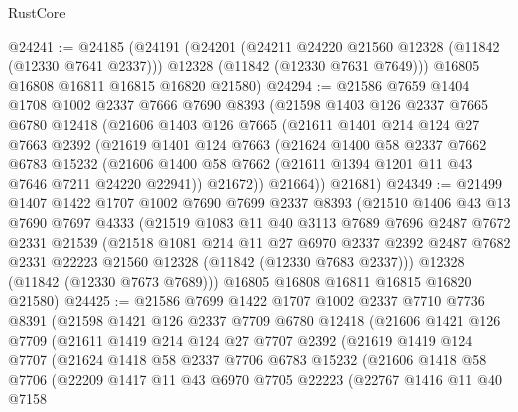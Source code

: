 \begin{lexlean}{RustCore}
\begin{coremodule}
@24241 := @24185
    (@24191
      (@24201
        (@24211 @24220 @21560 @12328 (@11842 (@12330 @7641 @2337)))
        @12328
        (@11842 (@12330 @7631 @7649)))
      @16805
      @16808
      @16811
      @16815
      @16820
      @21580)
@24294 := @21586
    @7659
    @1404
    @1708
    @1002
    @2337
    @7666
    @7690
    @8393
    (@21598
      @1403
      @126
      @2337
      @7665
      @6780
      @12418
      (@21606
        @1403
        @126
        @7665
        (@21611
          @1401
          @214
          @124
          @27
          @7663
          @2392
          (@21619
            @1401
            @124
            @7663
            (@21624
              @1400
              @58
              @2337
              @7662
              @6783
              @15232
              (@21606 @1400 @58 @7662 (@21611 @1394 @1201 @11 @43 @7646 @7211 @24220 @22941))
              @21672))
          @21664))
      @21681)
@24349 := @21499
    @1407
    @1422
    @1707
    @1002
    @7690
    @7699
    @2337
    @8393
    (@21510
      @1406
      @43
      @13
      @7690
      @7697
      @4333
      (@21519
        @1083
        @11
        @40
        @3113
        @7689
        @7696
        @2487
        @7672
        @2331
        @21539
        (@21518
          @1081
          @214
          @11
          @27
          @6970
          @2337
          @2392
          @2487
          @7682
          @2331
          @22223
          @21560
          @12328
          (@11842 (@12330 @7683 @2337)))
        @12328
        (@11842 (@12330 @7673 @7689)))
      @16805
      @16808
      @16811
      @16815
      @16820
      @21580)
@24425 := @21586
    @7699
    @1422
    @1707
    @1002
    @2337
    @7710
    @7736
    @8391
    (@21598
      @1421
      @126
      @2337
      @7709
      @6780
      @12418
      (@21606
        @1421
        @126
        @7709
        (@21611
          @1419
          @214
          @124
          @27
          @7707
          @2392
          (@21619
            @1419
            @124
            @7707
            (@21624
              @1418
              @58
              @2337
              @7706
              @6783
              @15232
              (@21606
                @1418
                @58
                @7706
                (@22209
                  @1417
                  @11
                  @43
                  @6970
                  @7705
                  @22223
                  (@22767
                    @1416
                    @11
                    @40
                    @7158

\end{coremodule}
\end{lexlean}

